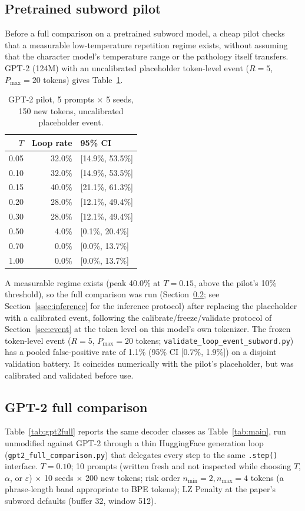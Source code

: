\documentclass[make,article,submit,pdftex]{Definitions/mdpi}
\begin{document}
\subsection{Pretrained subword pilot}
Before a full comparison on a pretrained subword model, a cheap pilot checks that a measurable low-temperature repetition regime exists, without assuming that the character model's temperature range or the pathology itself transfers. GPT-2 (124M) with an uncalibrated placeholder token-level event ($R{=}5$, $P_{\max}{=}20$ tokens) gives Table~\ref{tab:gpt2pilot}.

\begin{table}[H]
\centering
\caption{GPT-2 pilot, 5 prompts $\times$ 5 seeds, 150 new tokens, uncalibrated placeholder event.}
\label{tab:gpt2pilot}
\begin{tabular}{@{}rrl@{}}
\toprule
$T$ & Loop rate & 95\% CI \\
\midrule
0.05 & 32.0\% & [14.9\%, 53.5\%] \\
0.10 & 32.0\% & [14.9\%, 53.5\%] \\
0.15 & 40.0\% & [21.1\%, 61.3\%] \\
0.20 & 28.0\% & [12.1\%, 49.4\%] \\
0.30 & 28.0\% & [12.1\%, 49.4\%] \\
0.50 & 4.0\%  & [0.1\%, 20.4\%] \\
0.70 & 0.0\%  & [0.0\%, 13.7\%] \\
1.00 & 0.0\%  & [0.0\%, 13.7\%] \\
\bottomrule
\end{tabular}
\end{table}

A measurable regime exists (peak 40.0\% at $T{=}0.15$, above the pilot's 10\% threshold), so the full comparison was run (Section~\ref{sec:gpt2-full}; see Section~\ref{ssec:inference} for the inference protocol) after replacing the placeholder with a calibrated event, following the calibrate/freeze/validate protocol of Section~\ref{sec:event} at the token level on this model's own tokenizer. The frozen token-level event ($R{=}5$, $P_{\max}{=}20$ tokens; \texttt{validate\_\allowbreak{}loop\_\allowbreak{}event\_\allowbreak{}subword.py}) has a pooled false-positive rate of 1.1\% (95\% CI [0.7\%, 1.9\%]) on a disjoint validation battery. It coincides numerically with the pilot's placeholder, but was calibrated and validated before use.

\subsection{GPT-2 full comparison}
\label{sec:gpt2-full}
Table~\ref{tab:gpt2full} reports the same decoder classes as Table~\ref{tab:main}, run unmodified against GPT-2 through a thin HuggingFace generation loop (\texttt{gpt2\_\allowbreak{}full\_\allowbreak{}comparison.py}) that delegates every step to the same \texttt{.step()} interface. $T{=}0.10$; 10 prompts (written fresh and not inspected while choosing $T$, $\alpha$, or $\varepsilon$) $\times$ 10 seeds $\times$ 200 new tokens; risk order $n_{\min}{=}2,n_{\max}{=}4$ tokens (a phrase-length band appropriate to BPE tokens); LZ Penalty at the paper's subword defaults (buffer 32, window 512).
\end{document}
